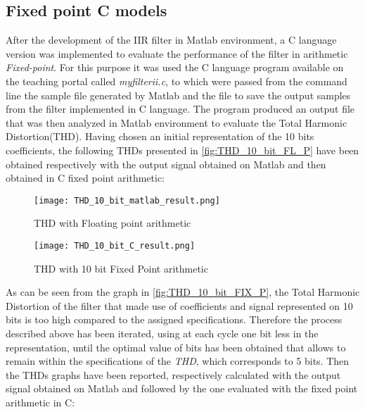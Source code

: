\subsection{Fixed point C models}
\label{subs:C model}

After the development of the IIR filter in Matlab environment, a C language version was implemented to evaluate the performance of the filter in arithmetic \textit{Fixed-point}. For this purpose it was used the C language program available on the teaching portal called \textit{myfilterii.c}, to which were passed from the command line the sample file generated by Matlab and the file to save the output samples from the filter implemented in C language. The program produced an output file that was then analyzed in Matlab environment to evaluate the Total Harmonic Distortion(THD). Having chosen an initial representation of the 10 bits coefficients, the following THDs presented in \autoref{fig:THD_10_bit_FL_P} have been obtained respectively with the output signal obtained on Matlab and then obtained in C fixed point arithmetic:

\begin{figure}[ht]
	\begin{minipage}[b]{0.5\linewidth}
		\centering
		\texttt{[image: THD\_10\_bit\_matlab\_result.png]}
		\caption{THD with Floating point arithmetic}
		\label{fig:THD_10_bit_FL_P}
	\end{minipage}
	\hspace{0.5cm}		
	\begin{minipage}[b]{0.5\linewidth}
		\centering
		\texttt{[image: THD\_10\_bit\_C\_result.png]}
		\caption{THD with 10 bit Fixed Point arithmetic}
		\label{fig:THD_10_bit_FIX_P}
	\end{minipage}
\end{figure}

As can be seen from the graph in \autoref{fig:THD_10_bit_FIX_P}, the Total Harmonic Distortion of the filter that made use of coefficients and signal represented on 10 bits is too high compared to the assigned specifications. Therefore the process described above has been iterated, using at each cycle one bit less in the representation, until the optimal value of bits has been obtained that allows to remain within the specifications of the \textit{THD}, which corresponds to 5 bits.
Then the THDs graphs have been reported, respectively calculated with the output signal obtained on Matlab and followed by the one evaluated with the fixed point arithmetic in C:

